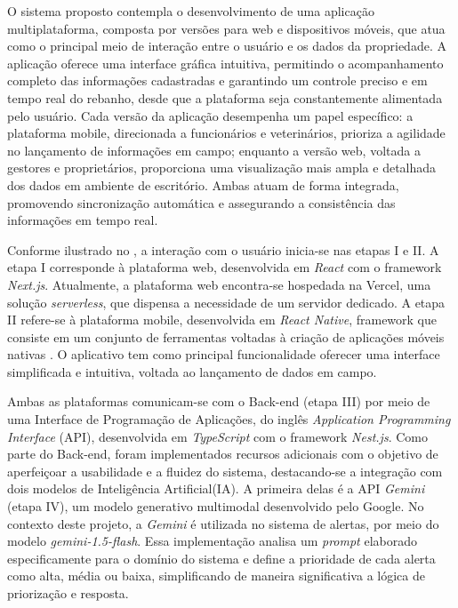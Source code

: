 O sistema proposto contempla o desenvolvimento de uma aplicação multiplataforma, composta por versões para web e dispositivos móveis, que atua como o principal meio de interação entre o usuário e os dados da propriedade. A aplicação oferece uma interface gráfica intuitiva, permitindo o acompanhamento completo das informações cadastradas e garantindo um controle preciso e em tempo real do rebanho, desde que a plataforma seja constantemente alimentada pelo usuário. Cada versão da aplicação desempenha um papel específico: a plataforma mobile, direcionada a funcionários e veterinários, prioriza a agilidade no lançamento de informações em campo; enquanto a versão web, voltada a gestores e proprietários, proporciona uma visualização mais ampla e detalhada dos dados em ambiente de escritório. Ambas atuam de forma integrada, promovendo sincronização automática e assegurando a consistência das informações em tempo real.

Conforme ilustrado no , a interação com o usuário inicia-se nas etapas I e II. A etapa I corresponde à plataforma web, desenvolvida em \textit{React} com o framework \textit{Next.js}. Atualmente, a plataforma web encontra-se hospedada na Vercel, uma solução \textit{serverless}, que dispensa a necessidade de um servidor dedicado. A etapa II refere-se à plataforma mobile, desenvolvida em \textit{React Native}, framework que consiste em um conjunto de ferramentas voltadas à criação de aplicações móveis nativas \cite{Bruna2021}. O aplicativo tem como principal funcionalidade oferecer uma interface simplificada e intuitiva, voltada ao lançamento de dados em campo.

Ambas as plataformas comunicam-se com o Back-end (etapa III) por meio de uma Interface de Programação de Aplicações, do inglês \textit{Application Programming Interface} (API), desenvolvida em \textit{TypeScript} com o framework \textit{Nest.js}. Como parte do Back-end, foram implementados recursos adicionais com o objetivo de aperfeiçoar a usabilidade e a fluidez do sistema, destacando-se a integração com dois modelos de Inteligência Artificial(IA). A primeira delas é a API \textit{Gemini} (etapa IV), um modelo generativo multimodal desenvolvido pelo Google. No contexto deste projeto, a \textit{Gemini} é utilizada no sistema de alertas, por meio do modelo \textit{gemini-1.5-flash}. Essa implementação analisa um \textit{prompt} elaborado especificamente para o domínio do sistema e define a prioridade de cada alerta como alta, média ou baixa, simplificando de maneira significativa a lógica de priorização e resposta.

